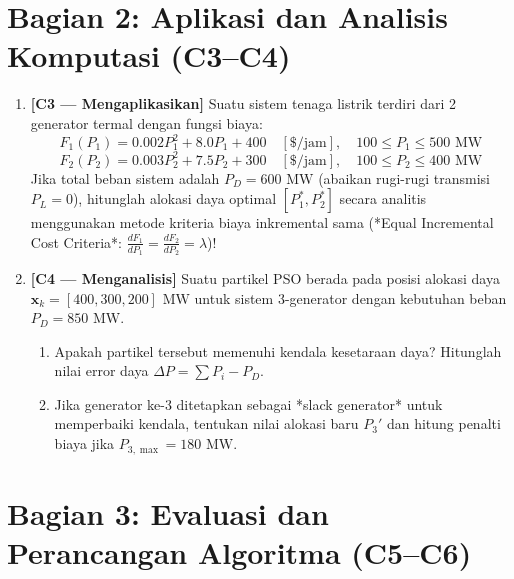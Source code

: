 \documentclass[11pt,a4paper]{article}
\begin{document}
\section*{Bagian 2: Aplikasi dan Analisis Komputasi (C3--C4)}

\begin{enumerate}[label=\textbf{Soal \arabic*:}, leftmargin=*, resume]
    \item \textbf{[C3 --- Mengaplikasikan]} Suatu sistem tenaga listrik terdiri dari 2 generator termal dengan fungsi biaya:
    \[
        F_1(P_1) = 0.002 P_1^2 + 8.0 P_1 + 400 \quad [\text{\$/jam}], \quad 100 \le P_1 \le 500\text{ MW}
    \]
    \[
        F_2(P_2) = 0.003 P_2^2 + 7.5 P_2 + 300 \quad [\text{\$/jam}], \quad 100 \le P_2 \le 400\text{ MW}
    \]
    Jika total beban sistem adalah $P_D = 600\text{ MW}$ (abaikan rugi-rugi transmisi $P_L=0$), hitunglah alokasi daya optimal $[P_1^*, P_2^*]$ secara analitis menggunakan metode kriteria biaya inkremental sama (*Equal Incremental Cost Criteria*: $\frac{dF_1}{dP_1} = \frac{dF_2}{dP_2} = \lambda$)!
    
    \begin{tcolorbox}[colback=white,colframe=gray!50,height=5cm,title=Ruang Jawaban Soal 3]
    \end{tcolorbox}

    \item \textbf{[C4 --- Menganalisis]} Suatu partikel PSO berada pada posisi alokasi daya $\mathbf{x}_k = [400, 300, 200]\text{ MW}$ untuk sistem 3-generator dengan kebutuhan beban $P_D = 850\text{ MW}$. 
    \begin{enumerate}[label=(\alph*)]
        \item Apakah partikel tersebut memenuhi kendala kesetaraan daya? Hitunglah nilai error daya $\Delta P = \sum P_i - P_D$.
        \item Jika generator ke-3 ditetapkan sebagai *slack generator* untuk memperbaiki kendala, tentukan nilai alokasi baru $P_3'$ dan hitung penalti biaya jika $P_{3,\max} = 180\text{ MW}$.
    \end{enumerate}
    
    \begin{tcolorbox}[colback=white,colframe=gray!50,height=5.5cm,title=Ruang Jawaban Soal 4]
    \end{tcolorbox}
\end{enumerate}

\section*{Bagian 3: Evaluasi dan Perancangan Algoritma (C5--C6)}
\end{document}
